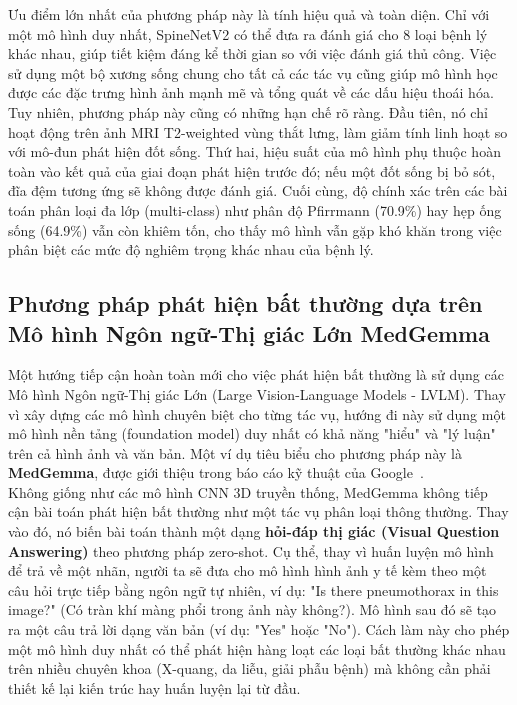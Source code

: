 Ưu điểm lớn nhất của phương pháp này là tính hiệu quả và toàn diện. Chỉ với một mô hình duy nhất, SpineNetV2 có thể đưa ra đánh giá cho 8 loại bệnh lý khác nhau, giúp tiết kiệm đáng kể thời gian so với việc đánh giá thủ công. Việc sử dụng một bộ xương sống chung cho tất cả các tác vụ cũng giúp mô hình học được các đặc trưng hình ảnh mạnh mẽ và tổng quát về các dấu hiệu thoái hóa.\\

Tuy nhiên, phương pháp này cũng có những hạn chế rõ ràng. Đầu tiên, nó chỉ hoạt động trên ảnh MRI T2-weighted vùng thắt lưng, làm giảm tính linh hoạt so với mô-đun phát hiện đốt sống. Thứ hai, hiệu suất của mô hình phụ thuộc hoàn toàn vào kết quả của giai đoạn phát hiện trước đó; nếu một đốt sống bị bỏ sót, đĩa đệm tương ứng sẽ không được đánh giá. Cuối cùng, độ chính xác trên các bài toán phân loại đa lớp (multi-class) như phân độ Pfirrmann (70.9\%) hay hẹp ống sống (64.9\%) vẫn còn khiêm tốn, cho thấy mô hình vẫn gặp khó khăn trong việc phân biệt các mức độ nghiêm trọng khác nhau của bệnh lý.\\

\subsection[Phát hiện bất thường bằng VLM (MedGemma)]{Phương pháp phát hiện bất thường dựa trên Mô hình Ngôn ngữ-Thị giác Lớn MedGemma}

Một hướng tiếp cận hoàn toàn mới cho việc phát hiện bất thường là sử dụng các Mô hình Ngôn ngữ-Thị giác Lớn (Large Vision-Language Models - LVLM). Thay vì xây dựng các mô hình chuyên biệt cho từng tác vụ, hướng đi này sử dụng một mô hình nền tảng (foundation model) duy nhất có khả năng "hiểu" và "lý luận" trên cả hình ảnh và văn bản. Một ví dụ tiêu biểu cho phương pháp này là \textbf{MedGemma}, được giới thiệu trong báo cáo kỹ thuật của Google~\cite{google2025medgemma}.\\

Không giống như các mô hình CNN 3D truyền thống, MedGemma không tiếp cận bài toán phát hiện bất thường như một tác vụ phân loại thông thường. Thay vào đó, nó biến bài toán thành một dạng \textbf{hỏi-đáp thị giác (Visual Question Answering)} theo phương pháp zero-shot. Cụ thể, thay vì huấn luyện mô hình để trả về một nhãn, người ta sẽ đưa cho mô hình hình ảnh y tế kèm theo một câu hỏi trực tiếp bằng ngôn ngữ tự nhiên, ví dụ: "Is there pneumothorax in this image?" (Có tràn khí màng phổi trong ảnh này không?). Mô hình sau đó sẽ tạo ra một câu trả lời dạng văn bản (ví dụ: "Yes" hoặc "No"). Cách làm này cho phép một mô hình duy nhất có thể phát hiện hàng loạt các loại bất thường khác nhau trên nhiều chuyên khoa (X-quang, da liễu, giải phẫu bệnh) mà không cần phải thiết kế lại kiến trúc hay huấn luyện lại từ đầu.\\

